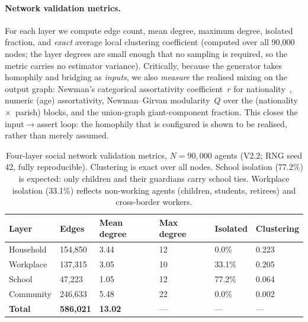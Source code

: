 \documentclass[a4paper,12pt]{article}
\begin{document}
\paragraph{Network validation metrics.}
For each layer we compute edge count, mean degree, maximum degree, isolated fraction,
and \emph{exact} average local clustering coefficient (computed over all 90{,}000
nodes; the layer degrees are small enough that no sampling is required, so the metric
carries no estimator variance). Critically, because the generator takes homophily and
bridging as \emph{inputs}, we also \emph{measure} the realised mixing on the output
graph: Newman's categorical assortativity coefficient~$r$ for
nationality~\cite{newman2003mixing}, numeric (age) assortativity, Newman--Girvan
modularity~$Q$ over the (nationality~$\times$~parish) blocks, and the union-graph
giant-component fraction. This closes the input$\rightarrow$assert loop: the homophily
that is configured is shown to be realised, rather than merely assumed.

\begin{table}[H]
\caption{Four-layer social network validation metrics, $N = 90{,}000$ agents
(V2.2; RNG seed 42, fully reproducible). Clustering is exact over all nodes.
School isolation (77.2\%) is expected: only children and their guardians carry
school ties. Workplace isolation (33.1\%) reflects non-working agents (children,
students, retirees) and cross-border workers.}
\label{tab:network_metrics}
\begin{tabularx}{\textwidth}{lXXXXX}
\toprule
\textbf{Layer} & \textbf{Edges} & \textbf{Mean degree} & \textbf{Max degree}
               & \textbf{Isolated} & \textbf{Clustering} \\
\midrule
Household   & 154,850 & 3.44 & 12 &  0.0\% & 0.223 \\
Workplace   & 137,315 & 3.05 & 10 & 33.1\% & 0.205 \\
School      &  47,223 & 1.05 & 12 & 77.2\% & 0.064 \\
Community   & 246,633 & 5.48 & 22 &  0.0\% & 0.002 \\
\midrule
\textbf{Total} & \textbf{586,021} & \textbf{13.02} & --- & --- & --- \\
\bottomrule
\end{tabularx}
\end{table}
\end{document}
